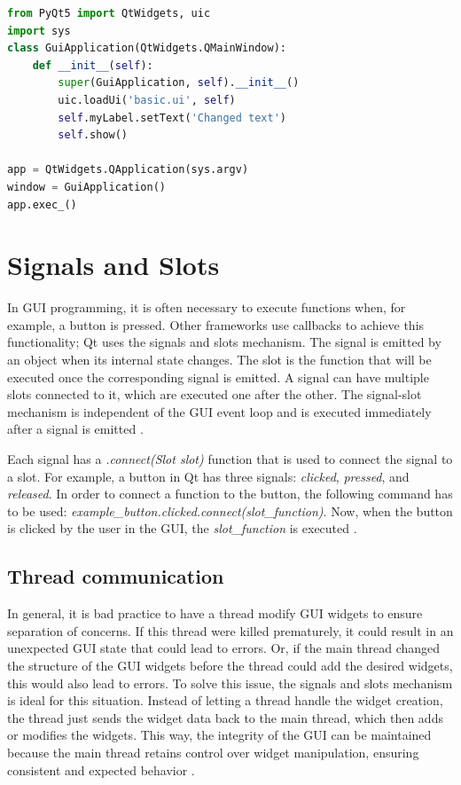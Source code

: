 \begin{lstlisting}[language=python, caption={Simple Qt GUI application}, label={lst:pyqt_gui}]
from PyQt5 import QtWidgets, uic
import sys
class GuiApplication(QtWidgets.QMainWindow):
    def __init__(self):
        super(GuiApplication, self).__init__()
        uic.loadUi('basic.ui', self)
        self.myLabel.setText('Changed text')
        self.show()

app = QtWidgets.QApplication(sys.argv)
window = GuiApplication()
app.exec_()
\end{lstlisting}

\section{Signals and Slots}
\label{sub:signals}

In GUI programming, it is often necessary to execute functions when, for example, a button is pressed. Other frameworks use callbacks to achieve this functionality; Qt uses the signals and slots mechanism. The signal is emitted by an object when its internal state changes. The slot is the function that will be executed once the corresponding signal is emitted. A signal can have multiple slots connected to it, which are executed one after the other. The signal-slot mechanism is independent of the GUI event loop and is executed immediately after a signal is emitted \cite{qt}.

Each signal has a \textit{.connect(Slot slot)} function that is used to connect the signal to a slot. For example, a button in Qt has three signals: \textit{clicked}, \textit{pressed}, and \textit{released}. In order to connect a function to the button, the following command has to be used: \textit{example\_button.clicked.connect(slot\_function)}. Now, when the button is clicked by the user in the GUI, the \textit{slot\_function} is executed \cite{pyqt}.


\subsection{Thread communication}
\label{sub:thread_communication}

In general, it is bad practice to have a thread modify GUI widgets to ensure separation of concerns. If this thread were killed prematurely, it could result in an unexpected GUI state that could lead to errors. Or, if the main thread changed the structure of the GUI widgets before the thread could add the desired widgets, this would also lead to errors. To solve this issue, the signals and slots mechanism is ideal for this situation. Instead of letting a thread handle the widget creation, the thread just sends the widget data back to the main thread, which then adds or modifies the widgets. This way, the integrity of the GUI can be maintained because the main thread retains control over widget manipulation, ensuring consistent and expected behavior \cite{qt}.

